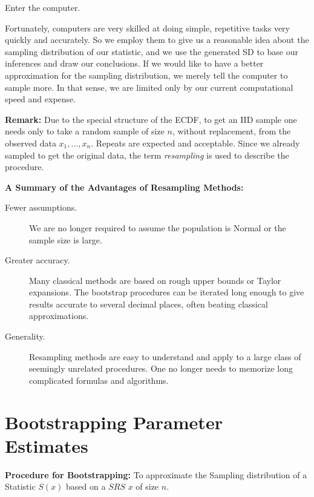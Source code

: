 \documentclass[11pt,english]{scrbook}
\begin{document}
\begin{center}
Enter the computer. 
\end{center}

Fortunately, computers are very skilled at doing simple, repetitive tasks very quickly and accurately. So we employ them to give us a reasonable idea about the sampling distribution of our statistic, and we use the generated SD to base our inferences and draw our conclusions. If we would like to have a better approximation for the sampling distribution, we merely tell the computer to sample more. In that sense, we are limited only by our current computational speed and expense.

\textbf{Remark:} Due to the special structure of the ECDF, to get an IID sample one needs only to take a random sample of size \(n\), without replacement, from the observed data \(x_{1},\ldots,x_{n}\). Repeats are expected and acceptable. Since we already sampled to get the original data, the term \emph{resampling} is used to describe the procedure.

\textbf{A Summary of the Advantages of Resampling Methods:}

\begin{description}
\item[{Fewer assumptions.}] We are no longer required to assume the population is Normal or the sample size is large.
\item[{Greater accuracy.}] Many classical methods are based on rough upper bounds or Taylor expansions. The bootstrap procedures can be iterated long enough to give results accurate to several decimal places, often beating classical approximations.
\item[{Generality.}] Resampling methods are easy to understand and apply to a large class of seemingly unrelated procedures. One no longer needs to memorize long complicated formulas and algorithms.
\end{description}

\section{Bootstrapping Parameter Estimates}
\label{sec:orgc045cf0}

\textbf{Procedure for Bootstrapping:} To approximate the Sampling distribution of a Statistic \(S(x)\) based on a \(SRS\) \(x\) of size \(n\).
\end{document}

